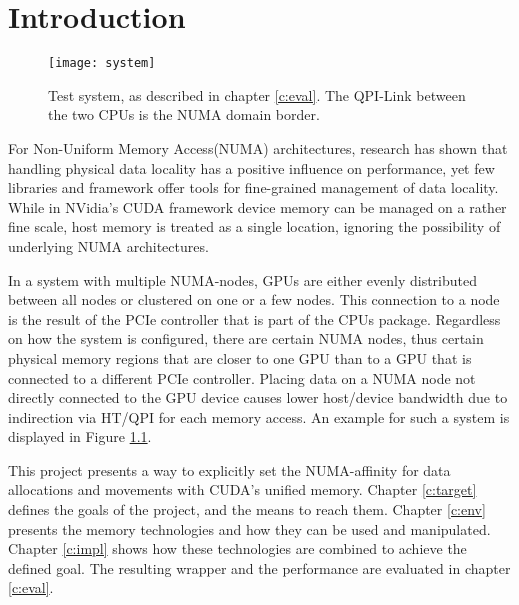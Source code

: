 \chapter{Introduction}\label{c:moti}
\begin{figure}[b!]
	\begin{center}
	\texttt{[image: system]}
	\label{f:sys}
	\caption{Test system, as described in chapter \ref{c:eval}. The QPI-Link between the two CPUs is the NUMA domain border.}
	\end{center}
\end{figure}
For Non-Uniform Memory Access(NUMA) architectures, research has shown that handling physical data locality has a positive influence on performance, yet few libraries and framework offer tools for fine-grained 
management of data locality. 
While in NVidia's CUDA framework device memory can be managed on a rather fine scale, host memory is treated as a single location, ignoring the possibility of underlying NUMA architectures.

In a system with multiple  NUMA-nodes, GPUs are either evenly distributed between all nodes or clustered on one or a few nodes. This connection to a node is the result of the PCIe controller that is part
	of the CPUs package. Regardless on how the system is configured, there are certain NUMA nodes, thus certain physical memory regions that are closer to one GPU than to a GPU that is connected to a different PCIe controller. Placing data on a NUMA node not directly connected to the GPU device causes lower host/device bandwidth due to indirection via HT/QPI for each memory access. An example for such a system is displayed in Figure \ref{f:sys}.

This project presents a way to explicitly set the NUMA-affinity for data allocations and movements with CUDA's unified memory. Chapter \ref{c:target} defines the goals of the project, and the means to reach them. Chapter \ref{c:env} presents the memory technologies and how they can be used and manipulated. Chapter \ref{c:impl} shows how these technologies are combined to achieve the defined goal. The resulting wrapper and the performance are evaluated in chapter \ref{c:eval}.

